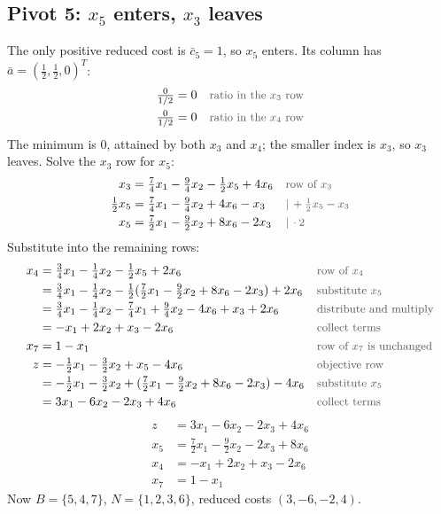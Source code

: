 \documentclass[a4paper,11pt]{article}
\newif\ifexplain
\newcommand{\teil}[1]{\subsection*{#1}}
\newcommand{\why}[1]{\text{\small\color{black!65}#1}}
\newcommand{\explain}[1]{\ifexplain\begin{erklbox}#1\end{erklbox}\fi}
\begin{document}
\teil{Pivot 5: $x_5$ enters, $x_3$ leaves}
The only positive reduced cost is $\bar c_5=1$, so $x_5$ enters. Its column has $\bar a = (\tfrac12,\tfrac12,0)^T$:
\begin{align*}
\tfrac{0}{1/2} &= 0 && \why{ratio in the $x_3$ row}\\
\tfrac{0}{1/2} &= 0 && \why{ratio in the $x_4$ row}
\end{align*}
The minimum is $0$, attained by both $x_3$ and $x_4$; the smaller index is $x_3$, so $x_3$ leaves. Solve the $x_3$ row for $x_5$:
\begin{align*}
x_3 &= \tfrac74 x_1 - \tfrac94 x_2 - \tfrac12 x_5 + 4x_6 && \why{row of $x_3$}\\
\tfrac12 x_5 &= \tfrac74 x_1 - \tfrac94 x_2 + 4x_6 - x_3 && \why{$|\,+\tfrac12 x_5 - x_3$}\\
x_5 &= \tfrac72 x_1 - \tfrac92 x_2 + 8x_6 - 2x_3 && \why{$|\,\cdot 2$}
\end{align*}
Substitute into the remaining rows:
\begin{align*}
x_4 &= \tfrac34 x_1 - \tfrac14 x_2 - \tfrac12 x_5 + 2x_6 && \why{row of $x_4$}\\
&= \tfrac34 x_1 - \tfrac14 x_2 - \tfrac12(\tfrac72 x_1 - \tfrac92 x_2 + 8x_6 - 2x_3) + 2x_6 && \why{substitute $x_5$}\\
&=\tfrac34x_1-\tfrac14x_2-\tfrac74x_1+\tfrac94x_2-4x_6+x_3+2x_6 && \why{distribute and multiply}\\
&= -x_1 + 2x_2 + x_3 - 2x_6 && \why{collect terms}\\
x_7 &= 1 - x_1 && \why{row of $x_7$ is unchanged}\\
z &= -\tfrac12 x_1 - \tfrac32 x_2 + x_5 - 4x_6 && \why{objective row}\\
&= -\tfrac12 x_1 - \tfrac32 x_2 + (\tfrac72 x_1 - \tfrac92 x_2 + 8x_6 - 2x_3) - 4x_6 && \why{substitute $x_5$}\\
&= 3x_1 - 6x_2 - 2x_3 + 4x_6 && \why{collect terms}
\end{align*}
\[
\begin{aligned}
z &= 3x_1 - 6x_2 - 2x_3 + 4x_6\\
x_5 &= \tfrac72 x_1 - \tfrac92 x_2 - 2x_3 + 8x_6\\
x_4 &= -x_1 + 2x_2 + x_3 - 2x_6\\
x_7 &= 1 - x_1
\end{aligned}
\]
Now $B=\{5,4,7\}$, $N=\{1,2,3,6\}$, reduced costs $(3,-6,-2,4)$.

\explain{Beide möglichen austretenden Variablen haben Wert null. Bland wählt $x_3$. Dass $x_5$ vorher bereits Basisvariable war, verbietet ihren erneuten Eintritt nicht.}
\end{document}
